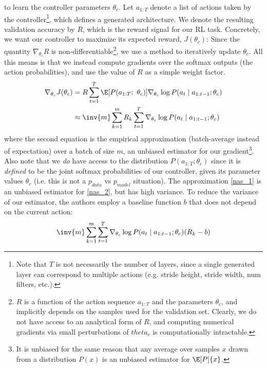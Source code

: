\documentclass[11pt]{article}
\newcommand\myspace[1][]{\vspace{#1\bigskipamount}}
\newcommand\p{\Needspace{10\baselineskip} \noindent}
\begin{document}
\myspace
\p {} to learn the controller parameters $\theta_c$. Let $a_{1:T}$ denote a list of actions taken by the controller\footnote{Note that $T$ is not necessarily the number of layers, since a single generated layer can correspond to multiple actions (e.g. stride height, stride width, num filters, etc.).}, which defines a generated architecture. We denote the resulting validation accuracy by $R$, which is the reward signal for our RL task. Concretely, we want our controller to maximize its expected reward, $J(\theta_c)$:
Since the quantity $\nabla_{\theta_c} R$ is non-differentiable\footnote{$R$ is a function of the action sequence $a_{1:T}$ and the parameters $\theta_c$, and implicitly depends on the samples used for the validation set. Clearly, we do not have access to an analytical form of $R$, and computing numerical gradients via small perturbations of $theta_c$ is computationally intractable.}, we use a  method to iteratively update $\theta_c$. All this means is that we instead compute gradients over the softmax outputs (the action probabilities), and use the value of $R$ as a simple weight factor.
\begin{align}
	\nabla_{\theta_c} J(\theta_c) 
	&= R \sum_{t = 1}^{T}   \E[P(a_{1:T};~ \theta_c)]{ \nabla_{\theta_c} \log P(a_t \mid a_{1:t-1}; \theta_c) }	\label{nas_1} \\
	&\approx \inv{m} \sum_{k = 1}^{m} R_k \sum_{t = 1}^{T} \nabla_{\theta_c} \log P(a_t \mid a_{1:t-1}; \theta_c) \label{nas_2}
\end{align}
where the second equation is the empirical approximation (batch-average instead of expectation) over a batch of size $m$, an unbiased estimator for our gradient\footnote{It is unbiased for the same reason that any average over samples $x$ drawn from a distribution $P(x)$ is an unbiased estimator for $\E[P]{x}$.}. Also note that we \textit{do} have access to the distribution $P(a_{1:T}; \theta_c)$ since it is \textit{defined} to be the joint softmax probabilities of our controller, given its parameter values $\theta_c$ (i.e. this is not a $p_{data}$ vs $p_{model}$ situation). The approximation \ref{nas_1} is an unbiased estimator for \ref{nas_2}, but has high variance. To reduce the variance of our estimator, the authors employ a baseline function $b$ that does not depend on the current action:
\begin{align}
 \inv{m} \sum_{k = 1}^{m} \sum_{t = 1}^{T} \nabla_{\theta_c} \log P(a_t \mid a_{1:t-1}; \theta_c) (R_k - b)
\end{align}
\end{document}
